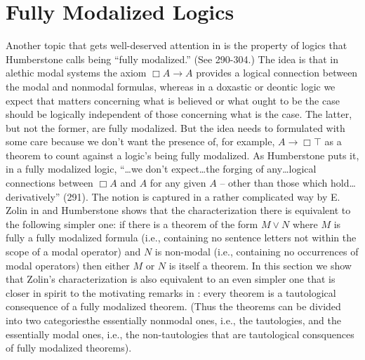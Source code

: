 \section{Fully Modalized Logics}

Another topic that gets well-deserved attention in \citet{Humberstone2016} is the property of logics that Humberstone calls being ``fully modalized.'' (See 290-304.) The idea is that in alethic modal systems the axiom $\Box A\rightarrow A$ provides a logical connection between the modal and nonmodal formulas, whereas in a doxastic or deontic logic we expect that matters concerning what is believed or what ought to be the case should be logically independent of those concerning what is the case. The latter, but not the former, are fully modalized. But the idea needs to formulated with some care because we don't want the presence of, for example, $A\rightarrow \Box \top $ as a theorem to count against a logic's being fully modalized. As Humberstone puts it, in a fully modalized logic, ``{\ldots}we don't expect{\ldots}the forging of any{\ldots}logical connections between $\Box A$ and $A$ for any given $A$ -- other than those which hold{\ldots}derivatively'' (291). The notion is captured in a rather complicated way by E. Zolin in \citet{Zolin.2000} and Humberstone shows that the characterization there is equivalent to the following simpler one: if there is a theorem of the form $M\vee N$ where $M$ is fully a fully modalized formula (i.e., containing no sentence letters not within the scope of a modal operator) and $N$ is non-modal (i.e., containing no occurrences of modal operators) then either $M$ or $N$ is itself a theorem. In this section we show that Zolin's characterization is also equivalent to an even simpler one that is closer in spirit to the motivating remarks in \citet{Humberstone2016}: every theorem is a tautological consequence of a fully modalized theorem. (Thus the theorems can be divided into two categories\textemdash the essentially nonmodal ones, i.e., the tautologies, and the essentially modal ones, i.e., the non-tautologies that are tautological consquences of fully modalized theorems). 

